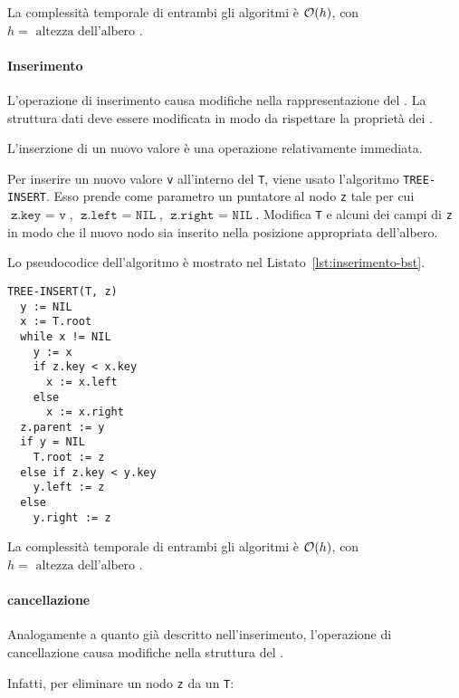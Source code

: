 \documentclass[italian, 10pt]{article}
\begin{document}
\bigskip
La complessità temporale di entrambi gli algoritmi è \(\mathcal{O}(h)\), con \(h = \text{ altezza dell'albero }\).

\paragraph{Inserimento}
\label{par:inserimento-bst}

L'operazione di inserimento causa modifiche nella rappresentazione del \BST.
La struttura dati deve essere modificata in modo da rispettare la proprietà dei \BST.

L'inserzione di un nuovo valore è una operazione relativamente immediata.

Per inserire un nuovo valore \texttt{v} all'interno del \BST \texttt{T}, viene usato l'algoritmo \texttt{TREE-INSERT}.
Esso prende come parametro un puntatore al nodo \texttt{z} tale per cui \(\texttt{z.key } = \texttt{ v}\), \(\texttt{z.left } = \texttt{ NIL}\), \(\texttt{z.right } = \texttt{ NIL}\).
Modifica \texttt{T} e alcuni dei campi di \texttt{z} in modo che il nuovo nodo sia inserito nella posizione appropriata dell'albero.

Lo pseudocodice dell'algoritmo è mostrato nel Listato~\ref{lst:inserimento-bst}.

\begin{lstlisting}[float, style=pseudocode, caption={Inserimento di un nuovo nodo}, label={lst:inserimento-bst}]
TREE-INSERT(T, z)
  y := NIL
  x := T.root
  while x != NIL
    y := x
    if z.key < x.key
      x := x.left
    else
      x := x.right
  z.parent := y
  if y = NIL
    T.root := z
  else if z.key < y.key
    y.left := z
  else
    y.right := z
\end{lstlisting}

\bigskip
La complessità temporale di entrambi gli algoritmi è \(\mathcal{O}(h)\), con \(h = \text{ altezza dell'albero }\).

\paragraph{cancellazione}
\label{par:cancellazione-bst}

Analogamente a quanto già descritto nell'inserimento, l'operazione di cancellazione causa modifiche nella struttura del \BST.

Infatti, per eliminare un nodo \texttt{z} da un \BST \texttt{T}:
\end{document}
